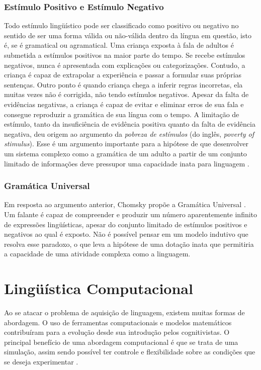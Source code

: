 \subsubsection{Estímulo Positivo e Estímulo Negativo}

Todo estímulo lingüístico pode ser classificado como positivo ou negativo no sentido de ser uma forma válida ou não-válida dentro da língua em questão, isto é, se é gramatical ou agramatical. Uma criança exposta à fala de adultos é submetida a estímulos positivos na maior parte do tempo. Se recebe estímulos negativos, nunca é apresentada com explicações ou categorizações. Contudo, a criança é capaz de extrapolar a experiência e passar a formular suas próprias sentenças. Outro ponto é quando criança chega a inferir regras incorretas, ela muitas vezes não é corrigida, não tendo estímulos negativos. Apesar da falta de evidências negativas, a criança é capaz de evitar e eliminar erros de sua fala e consegue reproduzir a gramática de sua língua com o tempo.
A limitação de estímulo, tanto da insuficiência de evidência positiva quanto da falta de evidência negativa, deu origem ao argumento da  \emph{pobreza de estímulos} (do inglês, \textit{poverty of stimulus}). Esse é um argumento importante para a hipótese de que desenvolver um sistema complexo como a gramática de um adulto a partir de um conjunto limitado de informações deve pressupor uma capacidade inata para linguagem \citep{chomsky65}.

\subsubsection{Gramática Universal}

Em resposta ao argumento anterior, Chomsky propõe a Gramática Universal \citep{chomsky65}. Um falante é capaz de compreender e produzir um número aparentemente infinito de expressões lingüísticas, apesar do conjunto limitado de estímulos positivos e negativos ao qual é exposto. Não é possível pensar em um modelo indutivo que resolva esse paradoxo, o que leva a hipótese de uma dotação inata que permitiria a capacidade de uma atividade complexa como a linguagem.

\section{Lingüística Computacional}

Ao se atacar o problema de aquisição de linguagem, existem muitas formas de abordagem. O uso de ferramentas computacionais e modelos matemáticos contribuíram para a evolução desde sua introdução pelos cognitivistas. O principal benefício de uma abordagem computacional é que se trata de uma simulação, assim sendo possível ter controle e flexibilidade sobre as condições que se deseja experimentar \citep{frank2011}.

